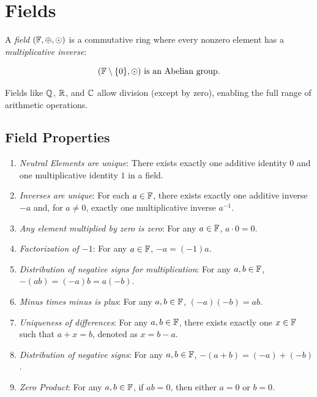 \chapter{Fields}

A \emph{field} \((\mathbb{F}, \oplus, \odot)\) is a commutative ring where every nonzero element has a \emph{multiplicative inverse}:

\[
	(\mathbb{F} \setminus \{0\}, \odot) \text{ is an Abelian group}.
\]

Fields like \(\mathbb{Q}\), \(\mathbb{R}\), and \(\mathbb{C}\) allow division (except by zero), enabling the full range of arithmetic operations.

\section{Field Properties}

\begin{enumerate}

	\item \emph{Neutral Elements are unique}: There exists exactly one additive identity \(0\) and one multiplicative identity \(1\) in a field.

	\item \emph{Inverses are unique}: For each \(a \in \mathbb{F}\), there exists exactly one additive inverse \(-a\) and, for \(a \ne 0\), exactly one multiplicative inverse \(a^{-1}\).

	\item \emph{Any element multiplied by zero is zero}: For any \(a \in \mathbb{F}\), \(a \cdot 0 = 0\).

	\item \emph{Factorization of \(-1\)}: For any \(a \in \mathbb{F}\), \(-a= (-1)a\).

	\item \emph{Distribution of negative signs for multiplication}: For any \(a, b \in \mathbb{F}\), \(-(ab) = (-a)b = a(-b)\).

	\item \emph{Minus times minus is plus}: For any \(a, b \in \mathbb{F}\), \((-a)(-b) = ab\).

	\item \emph{Uniqueness of differences}: For any \(a, b \in \mathbb{F}\), there exists exactly one \(x \in \mathbb{F}\) such that \(a + x = b\), denoted as \(x = b - a\).

	\item \emph{Distribution of negative signs}: For any \(a, b \in \mathbb{F}\), \(-(a + b) = (-a) + (-b)\).

	\item \emph{Zero Product}: For any \(a, b \in \mathbb{F}\), if \(ab = 0\), then either \(a = 0\) or \(b = 0\).

\end{enumerate}

